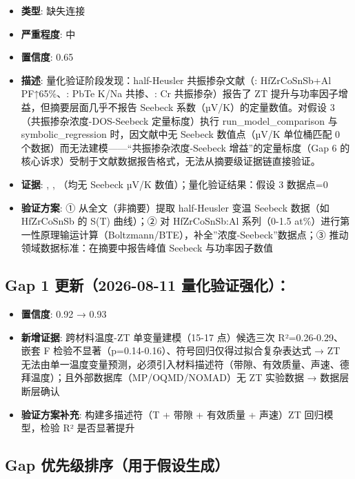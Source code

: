 \documentclass[12pt,a4paper]{ctexart}
\providecommand{\tightlist}{%
  \setlength{\itemsep}{0pt}\setlength{\parskip}{0pt}}
\begin{document}
\begin{itemize}
\tightlist
\item
  \textbf{类型}: 缺失连接
\item
  \textbf{严重程度}: 中
\item
  \textbf{置信度}: 0.65
\item
  \textbf{描述}: 量化验证阶段发现：half-Heusler 共振掺杂文献（\cite{TE146}: HfZrCoSnSb+Al PF↑65\%、\cite{TE087}: PbTe K/Na 共掺、\cite{TE101}: Cr 共振掺杂）报告了 ZT 提升与功率因子增益，但摘要层面几乎不报告 Seebeck 系数（µV/K）的定量数值。对假设 3（共振掺杂浓度-DOS-Seebeck 定量标度）执行 run\_model\_comparison 与 symbolic\_regression 时，因文献中无 Seebeck 数值点（µV/K 单位桶匹配 0 个数据）而无法建模------``共振掺杂浓度-Seebeck 增益''的定量标度（Gap 6 的核心诉求）受制于文献数据报告格式，无法从摘要级证据链直接验证。
\item
  \textbf{证据}: \cite{TE146}, \cite{TE087}, \cite{TE101}（均无 Seebeck µV/K 数值）；量化验证结果：假设 3 数据点=0
\item
  \textbf{验证方案}: ① 从全文（非摘要）提取 half-Heusler 变温 Seebeck 数据（如 HfZrCoSnSb 的 S(T) 曲线）；② 对 HfZrCoSnSb:Al 系列（0-1.5 at\%）进行第一性原理输运计算（Boltzmann/BTE），补全''浓度-Seebeck''数据点；③ 推动领域数据标准：在摘要中报告峰值 Seebeck 与功率因子数值
\end{itemize}

\subsection{Gap 1 更新（2026-08-11 量化验证强化）：}\label{gap:gap-1-ux66f4ux65b02026-08-11-ux91cfux5316ux9a8cux8bc1ux5f3aux5316}

\begin{itemize}
\tightlist
\item
  \textbf{置信度}: 0.92 → 0.93
\item
  \textbf{新增证据}: 跨材料温度-ZT 单变量建模（15-17 点）候选三次 R²=0.26-0.29、嵌套 F 检验不显著（p=0.14-0.16）、符号回归仅得过拟合复杂表达式 → ZT 无法由单一温度变量预测，必须引入材料描述符（带隙、有效质量、声速、德拜温度）；且外部数据库（MP/OQMD/NOMAD）无 ZT 实验数据 → 数据层断层确认
\item
  \textbf{验证方案补充}: 构建多描述符（T + 带隙 + 有效质量 + 声速）ZT 回归模型，检验 R² 是否显著提升
\end{itemize}

\subsection{Gap 优先级排序（用于假设生成）}\label{gap:gap-ux4f18ux5148ux7ea7ux6392ux5e8fux7528ux4e8eux5047ux8bbeux751fux6210}
\end{document}
